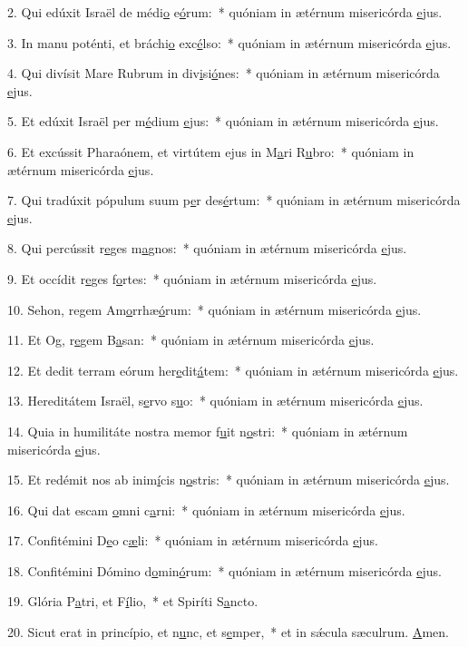 2. Qui edúxit Israël de médi\uline{o} e\uline{ó}rum:~* quóniam in ætérnum misericórda \uline{e}jus.\par 
3. In manu poténti, et bráchi\uline{o} exc\uline{é}lso:~* quóniam in ætérnum misericórda \uline{e}jus.\par 
4. Qui divísit Mare Rubrum in div\uline{i}si\uline{ó}nes:~* quóniam in ætérnum misericórda \uline{e}jus.\par 
5. Et edúxit Israël per m\uline{é}dium \uline{e}jus:~* quóniam in ætérnum misericórda \uline{e}jus.\par 
6. Et excússit Pharaónem, et virtútem ejus in M\uline{a}ri R\uline{u}bro:~* quóniam in ætérnum misericórda \uline{e}jus.\par 
7. Qui tradúxit pópulum suum p\uline{e}r des\uline{é}rtum:~* quóniam in ætérnum misericórda \uline{e}jus.\par 
8. Qui percússit r\uline{e}ges m\uline{a}gnos:~* quóniam in ætérnum misericórda \uline{e}jus.\par 
9. Et occídit r\uline{e}ges f\uline{o}rtes:~* quóniam in ætérnum misericórda \uline{e}jus.\par 
10. Sehon, regem Am\uline{o}rrhæ\uline{ó}rum:~* quóniam in ætérnum misericórda \uline{e}jus.\par 
11. Et Og, r\uline{e}gem B\uline{a}san:~* quóniam in ætérnum misericórda \uline{e}jus.\par 
12. Et dedit terram eórum her\uline{e}dit\uline{á}tem:~* quóniam in ætérnum misericórda \uline{e}jus.\par 
13. Hereditátem Israël, s\uline{e}rvo s\uline{u}o:~* quóniam in ætérnum misericórda \uline{e}jus.\par 
14. Quia in humilitáte nostra memor f\uline{u}it n\uline{o}stri:~* quóniam in ætérnum misericórda \uline{e}jus.\par 
15. Et redémit nos ab inim\uline{í}cis n\uline{o}stris:~* quóniam in ætérnum misericórda \uline{e}jus.\par 
16. Qui dat escam \uline{o}mni c\uline{a}rni:~* quóniam in ætérnum misericórda \uline{e}jus.\par 
17. Confitémini D\uline{e}o c\uline{æ}li:~* quóniam in ætérnum misericórda \uline{e}jus.\par 
18. Confitémini Dómino d\uline{o}min\uline{ó}rum:~* quóniam in ætérnum misericórda \uline{e}jus.\par 
19. Glória P\uline{a}tri, et F\uline{í}lio,~* et Spiríti S\uline{a}ncto.\par 
20. Sicut erat in princípio, et n\uline{u}nc, et s\uline{e}mper,~* et in sǽcula sæculrum. \uline{A}men.\par 
